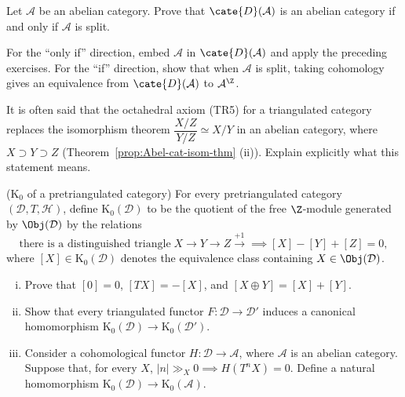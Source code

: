 \begin{Exercises}
	\item Let $\mathcal{A}$ be an abelian category. Prove that
	$\cate{D}(\mathcal{A})$ is an abelian category if and only if
	$\mathcal{A}$ is split.

	\begin{hint}
		For the ``only if'' direction, embed $\mathcal{A}$ in
		$\cate{D}(\mathcal{A})$ and apply the preceding exercises. For the ``if''
		direction, show that when $\mathcal{A}$ is split, taking cohomology gives
		an equivalence from $\cate{D}(\mathcal{A})$ to $\mathcal{A}^{\Z}$.
	\end{hint}

	\item It is often said that the octahedral axiom (TR5) for a triangulated
	category replaces the isomorphism theorem
	$\dfrac{X/Z}{Y/Z}\simeq X/Y$ in an abelian category, where
	$X\supset Y\supset Z$ (Theorem~\ref{prop:Abel-cat-isom-thm} (ii)). Explain
	explicitly what this statement means.

	\item ($\mathrm{K}_0$ of a pretriangulated category) For every
	pretriangulated category $(\mathcal{D},T,\mathcal{H})$, define
	$\mathrm{K}_0(\mathcal{D})$ to be the quotient of the free $\Z$-module
	generated by $\Obj(\mathcal{D})$ by the relations
	\[ \text{there is a distinguished triangle}\; X \to Y \to Z \xrightarrow{+1} \implies [X] - [Y] + [Z] = 0, \]
	where $[X]\in\mathrm{K}_0(\mathcal{D})$ denotes the equivalence class
	containing $X\in\Obj(\mathcal{D})$.
	\begin{enumerate}[(i)]
		\item Prove that $[0]=0$, $[TX]=-[X]$, and
		$[X\oplus Y]=[X]+[Y]$.
		\item Show that every triangulated functor
		$F:\mathcal{D}\to\mathcal{D}'$ induces a canonical homomorphism
		$\mathrm{K}_0(\mathcal{D})\to\mathrm{K}_0(\mathcal{D}')$.
		\item Consider a cohomological functor $H:\mathcal{D}\to\mathcal{A}$,
		where $\mathcal{A}$ is an abelian category. Suppose that, for every $X$,
		$|n|\gg_X0\implies H(T^nX)=0$. Define a natural homomorphism
		$\mathrm{K}_0(\mathcal{D})\to\mathrm{K}_0(\mathcal{A})$.


\end{enumerate}
\end{Exercises}
